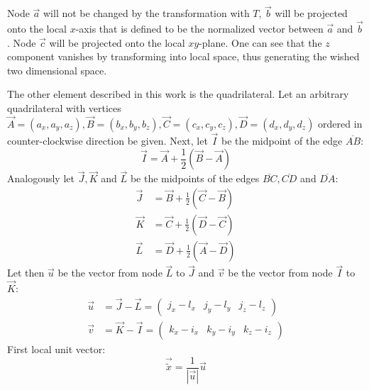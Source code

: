  Node $\vec{a}$ will not be changed by the transformation with $T$, $\vec{b}$ will be projected onto the local $x$-axis that is defined to be the normalized vector between $\vec{a}$ and $\vec{b}$. Node $\vec{c}$ will be projected onto the local $xy$-plane. One can see that the $z$ component vanishes by transforming into local space, thus generating the wished two dimensional space.
 
   
  The other element described in this work is the quadrilateral. Let an arbitrary quadrilateral with vertices $\vec{A} = (a_x, a_y, a_z), \vec{B} = (b_x, b_y, b_z), \vec{C} = (c_x, c_y, c_z), \vec{D} = (d_x, d_y, d_z)$ ordered in counter-clockwise direction be given. Next, let $\vec{I}$ be the midpoint of the edge $\overline{AB}$:
  \begin{equation}
   \vec{I} = \vec{A} + \frac{1}{2}\left( \vec{B}-\vec{A}\right) \nonumber 
  \end{equation}
  Analogously let $\vec{J}, \vec{K}$ and $\vec{L}$ be the midpoints of the edges $\overline{BC}, \overline{CD}$ and $\overline{DA}$:
  \begin{align}
   \vec{J} &= \vec{B} + \frac{1}{2}\left( \vec{C}-\vec{B}\right) \nonumber\\
   \vec{K} &= \vec{C} + \frac{1}{2}\left( \vec{D}-\vec{C}\right) \nonumber\\
   \vec{L} &= \vec{D} + \frac{1}{2}\left( \vec{A}-\vec{D}\right) \nonumber
  \end{align}
  Let then $\vec{u}$ be the vector from node $\vec{L}$ to $\vec{J}$ and $\vec{v}$ be the vector from node $\vec{I}$ to $\vec{K}$:
  \begin{align}
   \vec{u} &= \vec{J}-\vec{L} = \begin{pmatrix}
   j_x-l_x & j_y-l_y & j_z-l_z
   \end{pmatrix} \nonumber\\
   \vec{v} &= \vec{K}-\vec{I} = \begin{pmatrix}
   k_x-i_x & k_y-i_y & k_z-i_z
   \end{pmatrix} \nonumber
  \end{align}
  First local unit vector:
  \begin{equation}
   \vec{\tilde{x}} = \frac{1}{\left|\vec{u}\right|}\vec{u} \nonumber
  \end{equation}
